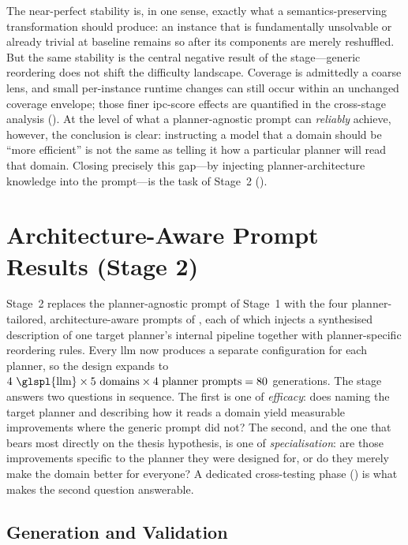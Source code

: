 The near-perfect stability is, in one sense, exactly what a semantics-preserving transformation should produce: an instance that is fundamentally unsolvable or already trivial at baseline remains so after its components are merely reshuffled.
But the same stability is the central negative result of the stage---generic reordering does not shift the difficulty landscape.
Coverage is admittedly a coarse lens, and small per-instance runtime changes can still occur within an unchanged coverage envelope; those finer \gls{ipc}-score effects are quantified in the cross-stage analysis ().
At the level of what a planner-agnostic prompt can \emph{reliably} achieve, however, the conclusion is clear: instructing a model that a domain should be ``more efficient'' is not the same as telling it how a particular planner will read that domain.
Closing precisely this gap---by injecting planner-architecture knowledge into the prompt---is the task of Stage~2 ().

\section{Architecture-Aware Prompt Results (Stage 2)}
\label{sec:results:stage2}

Stage~2 replaces the planner-agnostic prompt of Stage~1 with the four planner-tailored, architecture-aware prompts of , each of which injects a synthesised description of one target planner's internal pipeline together with planner-specific reordering rules.
Every \gls{llm} now produces a separate configuration for each planner, so the design expands to $4~\text{\glspl{llm}} \times 5~\text{domains} \times 4~\text{planner prompts} = 80$ generations.
The stage answers two questions in sequence.
The first is one of \emph{efficacy}: does naming the target planner and describing how it reads a domain yield measurable improvements where the generic prompt did not?
The second, and the one that bears most directly on the thesis hypothesis, is one of \emph{specialisation}: are those improvements specific to the planner they were designed for, or do they merely make the domain better for everyone?
A dedicated cross-testing phase () is what makes the second question answerable.

\subsection{Generation and Validation}
\label{sec:results:stage2:generation}

